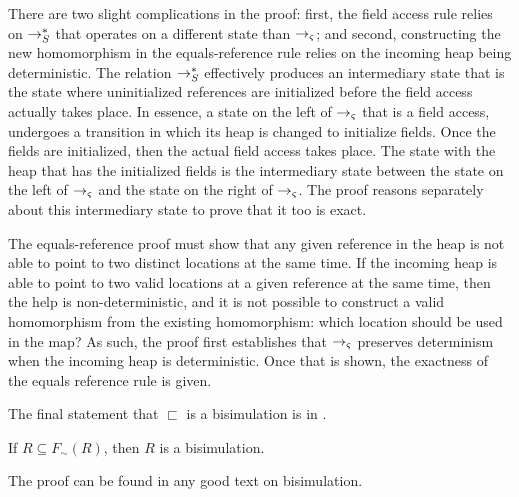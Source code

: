 There are two slight complications in the proof: first, the field
access rule relies on $\rightarrow_S^*$ that operates on a different
state than $\rightarrow_{\varsigma}$; and second, constructing the new
homomorphism in the equals-reference rule relies on the incoming heap
being deterministic. The relation $\rightarrow_S^*$ effectively produces
an intermediary state that is the state where uninitialized references
are initialized before the field access actually takes place. In
essence, a state on the left of $\rightarrow_{\varsigma}$ that is a
field access, undergoes a transition in which its heap is changed to
initialize fields. Once the fields are initialized, then the actual
field access takes place. The state with the heap that has the
initialized fields is the intermediary state between the state on the
left of $\rightarrow_{\varsigma}$ and the state on the right of $\rightarrow_{\varsigma}$. The proof reasons separately about this
intermediary state to prove that it too is exact.

The equals-reference proof must show that any given reference in the
heap is not able to point to two distinct locations at the same
time. If the incoming heap is able to point to two valid locations at
a given reference at the same time, then the help is
non-deterministic, and it is not possible to construct a valid
homomorphism from the existing homomorphism: which location should be
used in the map? As such, the proof first establishes that
$\rightarrow_{\varsigma}$ preserves determinism when the incoming heap is
deterministic. Once that is shown, the exactness of the equals
reference rule is given.

The final statement that $\sqsubset$ is a bisimulation is in .

\begin{theorem}
If $R \subseteq F_\sim(R)$, then $R$ is a bisimulation.
\label{lem:bisim}
\end{theorem}
The proof can be found in any good text on bisimulation.

\begin{theorem}

\end{theorem}


